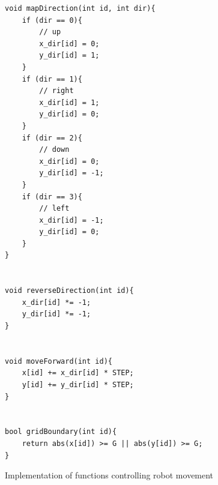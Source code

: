 \begin{figure}[H]
\caption{Implementation of functions controlling robot movement}
\begin{lstlisting}[style=C++]
void mapDirection(int id, int dir){
    if (dir == 0){
		// up
        x_dir[id] = 0;
        y_dir[id] = 1;
    }
    if (dir == 1){
		// right
        x_dir[id] = 1;
        y_dir[id] = 0;
    }
    if (dir == 2){
		// down
        x_dir[id] = 0;
        y_dir[id] = -1;
    }
    if (dir == 3){
		// left
        x_dir[id] = -1;
        y_dir[id] = 0;
    }
}


void reverseDirection(int id){
	x_dir[id] *= -1;
	y_dir[id] *= -1;
}


void moveForward(int id){
	x[id] += x_dir[id] * STEP;
	y[id] += y_dir[id] * STEP;
}


bool gridBoundary(int id){
    return abs(x[id]) >= G || abs(y[id]) >= G;
}
\end{lstlisting}
\label{fig:movement_implementation}
\end{figure}
\newpage

